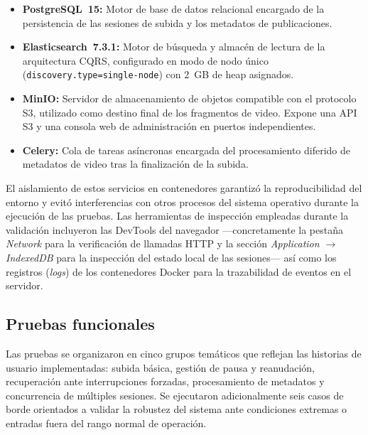 \begin{itemize}
  \item \textbf{PostgreSQL~15:} Motor de base de datos relacional encargado de la persistencia de
  las sesiones de subida y los metadatos de publicaciones.

  \item \textbf{Elasticsearch~7.3.1:} Motor de búsqueda y almacén de lectura de la arquitectura
  CQRS, configurado en modo de nodo único (\texttt{discovery.type=single-node}) con 2~GB de heap
  asignados.

  \item \textbf{MinIO:} Servidor de almacenamiento de objetos compatible con el protocolo S3,
  utilizado como destino final de los fragmentos de video. Expone una API S3 y una consola web
  de administración en puertos independientes.

  \item \textbf{Celery:} Cola de tareas asíncronas encargada del procesamiento diferido de
  metadatos de video tras la finalización de la subida.
\end{itemize}

El aislamiento de estos servicios en contenedores garantizó la reproducibilidad del entorno y
evitó interferencias con otros procesos del sistema operativo durante la ejecución de las pruebas.
Las herramientas de inspección empleadas durante la validación incluyeron las DevTools del
navegador ---concretamente la pestaña \textit{Network} para la verificación de llamadas HTTP y la
sección \textit{Application $\rightarrow$ IndexedDB} para la inspección del estado local de las
sesiones--- así como los registros (\textit{logs}) de los contenedores Docker para la trazabilidad
de eventos en el servidor.

\subsection{Pruebas funcionales}
\label{subsec:pruebas}

Las pruebas se organizaron en cinco grupos temáticos que reflejan las historias de usuario
implementadas: subida básica, gestión de pausa y reanudación, recuperación ante interrupciones
forzadas, procesamiento de metadatos y concurrencia de múltiples sesiones. Se ejecutaron adicionalmente
seis casos de borde orientados a validar la robustez del sistema ante condiciones extremas o
entradas fuera del rango normal de operación.

